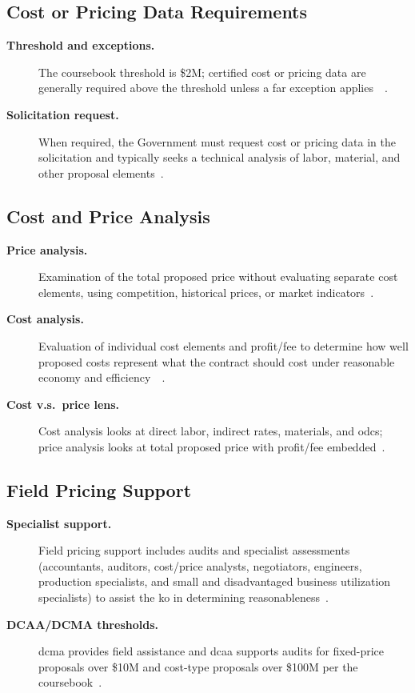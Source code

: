 \documentclass[../main.tex]{subfiles}
\begin{document}
\subsection{Cost or Pricing Data Requirements}
\begin{description}
  \item[\textbf{Threshold and exceptions.}] The coursebook threshold is \$2M; certified cost or pricing data are generally required above the threshold unless a \ac{far} exception applies~\autocite[\S~15.403-1]{FAR}~\autocite{edo-3-2-4-cost-price-evaluation-2025}.
  \item[\textbf{Solicitation request.}] When required, the Government must request cost or pricing data in the solicitation and typically seeks a technical analysis of labor, material, and other proposal elements~\autocite{edo-3-2-4-cost-price-evaluation-2025}.
\end{description}

\subsection{Cost and Price Analysis}
\begin{description}
  \item[\textbf{Price analysis.}] Examination of the total proposed price without evaluating separate cost elements, using competition, historical prices, or market indicators~\autocite[\S~15.404-1(b)]{FAR}.
  \item[\textbf{Cost analysis.}] Evaluation of individual cost elements and profit/fee to determine how well proposed costs represent what the contract should cost under reasonable economy and efficiency~\autocite[\S~15.404-1(c)]{FAR}~\autocite{edo-3-2-4-cost-price-evaluation-2025}.
  \item[\textbf{Cost v.s.\ price lens.}] Cost analysis looks at direct labor, indirect rates, materials, and \acp{odc}; price analysis looks at total proposed price with profit/fee embedded~\autocite{edo-3-2-4-cost-price-evaluation-2025}.
\end{description}

\subsection{Field Pricing Support}
\begin{description}
  \item[\textbf{Specialist support.}] Field pricing support includes audits and specialist assessments (accountants, auditors, cost/price analysts, negotiators, engineers, production specialists, and small and disadvantaged business utilization specialists) to assist the \ac{ko} in determining reasonableness~\autocite{edo-3-2-4-cost-price-evaluation-2025}.
  \item[\textbf{DCAA/DCMA thresholds.}] \ac{dcma} provides field assistance and \ac{dcaa} supports audits for fixed-price proposals over \$10M and cost-type proposals over \$100M per the coursebook~\autocite{edo-3-2-4-cost-price-evaluation-2025}.
\end{description}
\end{document}
